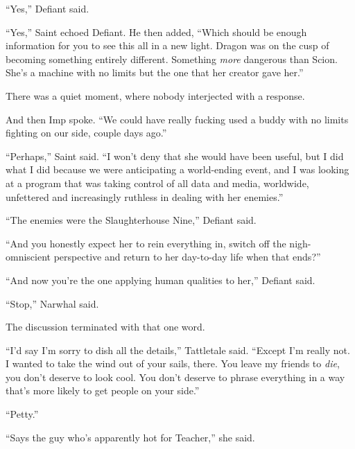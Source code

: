 ``Yes,'' Defiant said.



``Yes,'' Saint echoed Defiant.  He then added, ``Which should be enough information for you to see this all in a new light.  Dragon was on the cusp of becoming something entirely different.  Something \emph{more} dangerous than Scion.  She's a machine with no limits but the one that her creator gave her.''



There was a quiet moment, where nobody interjected with a response.



And then Imp spoke.  ``We could have really fucking used a buddy with no limits fighting on our side, couple days ago.''



``Perhaps,'' Saint said.  ``I won't deny that she would have been useful, but I did what I did because we were anticipating a world-ending event, and I was looking at a program that was taking control of all data and media, worldwide, unfettered and increasingly ruthless in dealing with her enemies.''



``The enemies were the Slaughterhouse Nine,'' Defiant said.



``And you honestly expect her to rein everything in, switch off the nigh-omniscient perspective and return to her day-to-day life when that ends?''



``And now you're the one applying human qualities to her,'' Defiant said.



``Stop,'' Narwhal said.



The discussion terminated with that one word.



``I'd say I'm sorry to dish all the details,'' Tattletale said.  ``Except I'm really not.  I wanted to take the wind out of your sails, there.  You leave my friends to \emph{die}, you don't deserve to look cool.  You don't deserve to phrase everything in a way that's more likely to get people on your side.''



``Petty.''



``Says the guy who's apparently hot for Teacher,'' she said.



